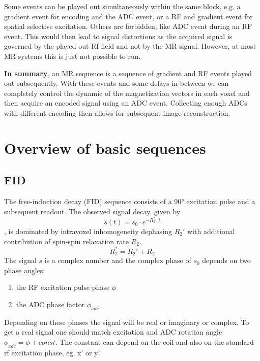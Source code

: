 \documentclass[a4paper,12pt]{extarticle}
\begin{document}
Some events can be played out simultaneously within the same block, e.g. a gradient event for encoding and the ADC event, or a RF and gradient event for spatial selective excitation. Others are forbidden, like ADC event during an RF event. This would then lead to signal distortions as the acquired signal is governed by the played out Rf field and not by the MR signal. However, at most MR systems this is just not possible to run.


\textbf{In summary}, an MR sequence is a sequence of gradient and RF events played out subsequently. With these events and some delays in-between we can completely control the dynamic of the magnetization vectors in each voxel and then acquire an encoded signal using an ADC event. Collecting enough ADCs with different encoding then allows for subsequent image reconstruction.

\newpage
\section{Overview of basic sequences}
\vspace{7.5cm}

\subsection{FID}
The free-induction decay (FID) sequence consists of a 90° excitation pulse and a subsequent readout. The observed signal decay, given by
\begin{equation}
\label{eq:FID}
s(t)=s_0\cdot e^{-R_2^*\cdot t}
\end{equation}
, is dominated by intravoxel inhomogeneity dephasing $R_2'$ with additional contribution of spin-spin relaxation rate $R_2$.
\begin{equation}
R_2^*=R_2'+R_2
\end{equation}The signal $s$ is a complex number and the complex phase of $s_0$ depends on two phase angles:
\begin{enumerate}
\item the RF excitation pulse phase $\phi$
\item the ADC phase factor $\phi_{adc}$
\end{enumerate}
Depending on these phases the signal will be real or imaginary or complex. To get a real signal one should match excitation and ADC rotation angle $\phi_{adc}=\phi+const.$ The constant can depend on the coil and also on the standard rf excitation phase, eg. x' or y'.
\end{document}
